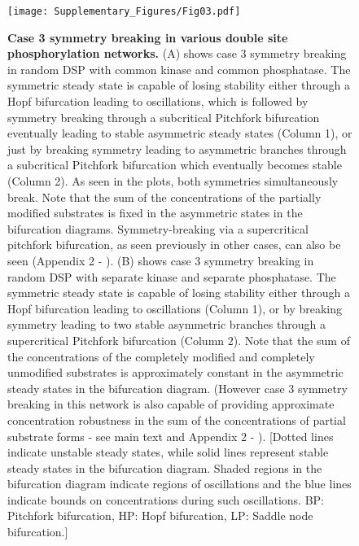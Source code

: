 \documentclass[16pt, a4paper]{article}
\begin{document}
\clearpage
\begin{figure}[h!]
    \centering
    \texttt{[image: Supplementary\_Figures/Fig03.pdf]}
    \caption{\textbf{Case 3 symmetry breaking in various double site phosphorylation networks.}
    (A) shows case 3 symmetry breaking in random DSP with common kinase and common phosphatase. The symmetric steady state is capable of losing stability either through a Hopf bifurcation leading to oscillations, which is followed by symmetry breaking through a subcritical Pitchfork bifurcation eventually leading to stable asymmetric steady states (Column 1), or just by breaking symmetry leading to asymmetric branches through a subcritical Pitchfork bifurcation which eventually becomes stable (Column 2). As seen in the plots, both symmetries simultaneously break. Note that the sum of the concentrations of the partially modified substrates is fixed in the asymmetric states in the bifurcation diagrams.
    Symmetry-breaking via a supercritical pitchfork bifurcation, as seen previously in other cases, can also be seen (Appendix 2 - ).
    (B) shows case 3 symmetry breaking in random DSP with separate kinase and separate phosphatase. The symmetric steady state is capable of losing stability either through a Hopf bifurcation leading to oscillations (Column 1), or by breaking symmetry leading to two stable asymmetric branches through a supercritical Pitchfork bifurcation (Column 2). Note that the sum of the concentrations of the completely modified and completely unmodified substrates is approximately constant in the asymmetric steady states in the bifurcation diagram. (However case 3 symmetry breaking in this network is also capable of providing approximate concentration robustness in the sum of the concentrations of partial substrate forms - see main text and Appendix 2 - ).
    [Dotted lines indicate unstable steady states, while solid lines represent stable steady states in the bifurcation diagram. Shaded regions in the bifurcation diagram indicate regions of oscillations and the blue lines indicate bounds on concentrations during such oscillations. BP: Pitchfork bifurcation, HP: Hopf bifurcation, LP: Saddle node bifurcation.]}
    \label{Fig 3}
\end{figure}
\end{document}
